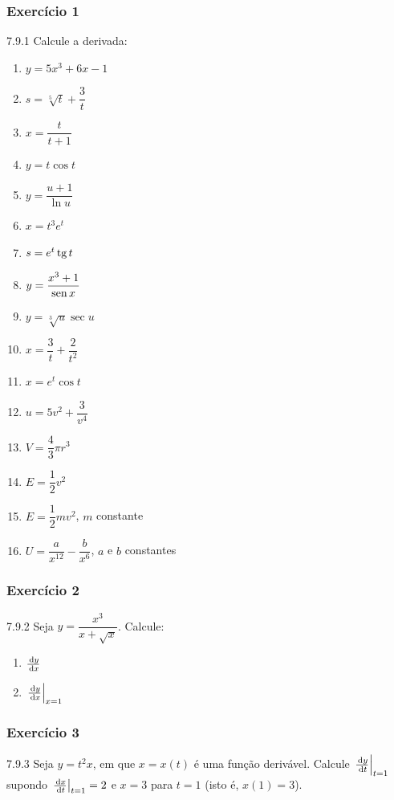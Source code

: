 \subsubsection*{Exercício 1}
\begin{exercicio}[1]{7.9.1}
Calcule a derivada:
\begin{enumerate}[label=\alph*)]
    \item $y = 5x^3 + 6x - 1$
    \item $s = \sqrt[5]{t} + \dfrac{3}{t}$
    \item $x = \dfrac{t}{t + 1}$
    \item $y = t \cos t$
    \item $y = \dfrac{u + 1}{\ln u}$
    \item $x = t^3 e^t$
    \item $s = e^t \operatorname{tg} t$
    \item $y = \dfrac{x^3 + 1}{\operatorname{sen} x}$
    \item $y = \sqrt[3]{u} \sec u$
    \item $x = \dfrac{3}{t} + \dfrac{2}{t^2}$
    \item $x = e^t \cos t$
    \item $u = 5v^2 + \dfrac{3}{v^4}$
    \item $V = \dfrac{4}{3}\pi r^3$
    \item $E = \dfrac{1}{2}v^2$
    \item $E = \dfrac{1}{2}mv^2$, $m$ constante
    \item $U = \dfrac{a}{x^{12}} - \dfrac{b}{x^6}$, $a$ e $b$ constantes
\end{enumerate}
\end{exercicio}

\subsubsection*{Exercício 2}
\begin{exercicio}[2]{7.9.2}
Seja $y = \dfrac{x^3}{x + \sqrt{x}}$. Calcule:
\begin{enumerate}[label=\alph*)]
    \item $\frac{\,\mathrm{d} y}{\,\mathrm{d} x}$
    \item $\left.\frac{\,\mathrm{d} y}{\,\mathrm{d} x}\right|_{x = 1}$
\end{enumerate}
\end{exercicio}

\subsubsection*{Exercício 3}
\begin{exercicio}[3]{7.9.3}
Seja $y = t^2 x$, em que $x = x(t)$ é uma função derivável. Calcule $\left.\frac{\,\mathrm{d} y}{\,\mathrm{d} t}\right|_{t = 1}$ supondo $\left.\frac{\,\mathrm{d} x}{\,\mathrm{d} t}\right|_{t = 1} = 2$ e $x = 3$ para $t = 1$ (isto é, $x(1) = 3$).
\end{exercicio}

